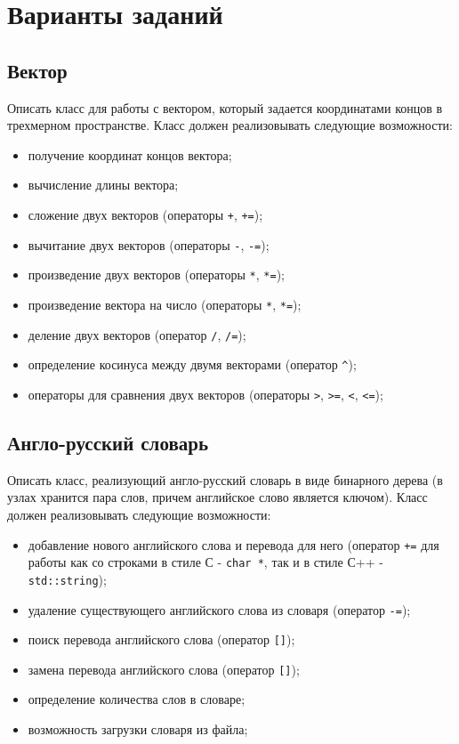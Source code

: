\documentclass[a4paper,12pt]{article}
\begin{document}
\section{Варианты заданий}
\label{sec:Tasks}

\subsection{Вектор}

Описать класс для работы с вектором, который задается координатами
концов в трехмерном пространстве.  Класс должен реализовывать
следующие возможности:

\begin{itemize}
\item получение координат концов вектора;
\item вычисление длины вектора;
\item сложение двух векторов (операторы \lstinline|+|,
  \lstinline|+=|);
\item вычитание двух векторов (операторы \lstinline|-|,
  \lstinline|-=|);
\item произведение двух векторов (операторы \lstinline|*|,
  \lstinline|*=|);
\item произведение вектора на число (операторы \lstinline|*|,
  \lstinline|*=|);
\item деление двух векторов (оператор \lstinline|/|, \lstinline|/=|);
\item определение косинуса между двумя векторами (оператор
  \lstinline|^|);
\item операторы для сравнения двух векторов (операторы \lstinline|>|,
  \lstinline|>=|, \lstinline|<|, \lstinline|<=|);
\end{itemize}

\subsection{Англо-русский словарь}

Описать класс, реализующий англо-русский словарь в виде бинарного
дерева (в узлах хранится пара слов, причем английское слово является
ключом). Класс должен реализовывать следующие возможности:

\begin{itemize}
\item добавление нового английского слова и перевода для него
  (оператор \lstinline|+=| для работы как со строками в стиле С -
  \lstinline|char *|, так и в стиле С++ - \lstinline|std::string|);
\item удаление существующего английского слова из словаря (оператор
  \lstinline|-=|);
\item поиск перевода английского слова (оператор \lstinline|[]|);
\item замена перевода английского слова (оператор \lstinline|[]|);
\item определение количества слов в словаре;
\item возможность загрузки словаря из файла;
\end{itemize}
\end{document}
